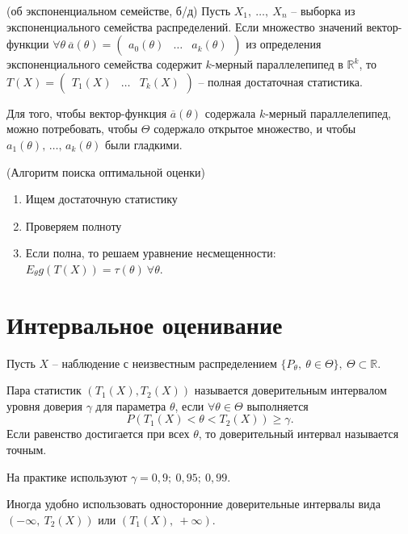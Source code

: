 \begin{theorem}
    (об экспоненциальном семействе, б/д) Пусть $\displaystyle X_{1} ,\ \dotsc ,\ X_{n}$ -- выборка из экспоненциального семейства распределений. Если множество значений вектор-функции $\displaystyle \forall \theta \ \overline{a}( \theta ) =\begin{pmatrix}
    a_{0}( \theta ) & \dotsc  & a_{k}( \theta )
    \end{pmatrix}$ из определения экспоненциального семейства содержит $\displaystyle k$-мерный параллелепипед в $\displaystyle \mathbb{R}^{k}$, то $\displaystyle T( X) =\begin{pmatrix}
    T_{1}( X) & \dotsc  & T_{k}( X)
    \end{pmatrix}$ -- полная достаточная статистика.
\end{theorem}
\begin{note}
    Для того, чтобы вектор-функция $\overline{a}(\theta)$ содержала $k$-мерный параллелепипед, можно потребовать, чтобы $\Theta$ содержало открытое множество, и чтобы $a_1(\theta),\, \ldots,\, a_k(\theta)$ были гладкими.
\end{note}

\begin{proposition}
    (Алгоритм поиска оптимальной оценки)
    \begin{enumerate}
    \item Ищем достаточную статистику
    \item Проверяем полноту
    \item Если полна, то решаем уравнение несмещенности: $\displaystyle E_{\theta } g( T( X)) =\tau ( \theta ) \ \forall \theta $.
    \end{enumerate}
\end{proposition}

\section{Интервальное оценивание}

Пусть $\displaystyle X$ -- наблюдение с неизвестным распределением $\displaystyle \{P_{\theta } ,\ \theta \in \Theta \} ,\ \Theta \subset \mathbb{R}$. 

\begin{definition}
    Пара статистик $\displaystyle ( T_{1}( X) ,T_{2}( X))$ называется доверительным интервалом уровня доверия $\displaystyle \gamma $ для параметра $\displaystyle \theta $, если $\displaystyle \forall \theta \in \Theta $ выполняется
\begin{equation*}
    P( T_{1}( X) < \theta < T_{2}( X)) \geqslant \gamma .
\end{equation*}
Если равенство достигается при всех $\displaystyle \theta $, то доверительный интервал называется точным.
\end{definition}
\begin{note}
    На практике используют $\displaystyle \gamma =0,9;\ 0,95;\ 0,99$.
\end{note}
Иногда удобно использовать односторонние доверительные интервалы вида $\displaystyle ( -\infty ,\ T_{2}( X))$ или $\displaystyle ( T_{1}( X) ,\ +\infty )$.


